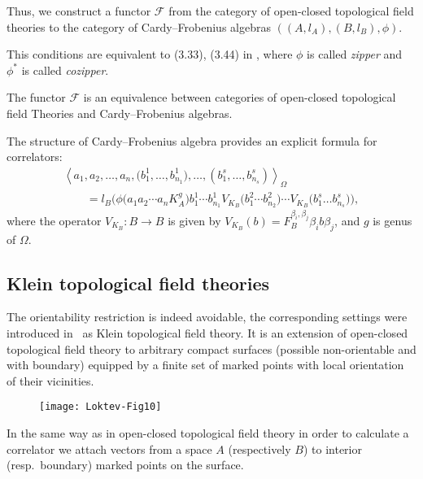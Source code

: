 \documentclass[pdftex]{sigma}
\def \lc {\left<}
\def \rc {\right>}
\begin{document}
Thus, we construct a functor $\mathcal{F}$ from the category of
open-closed  topological f\/ield theories to the category of
Cardy--Frobenius algebras $((A,l_A),(B,l_B),\phi)$.

\begin{note}
This conditions are equivalent to  (3.33), (3.44) in \cite{LP}, where $\phi$ is called {\em zipper} and $\phi^*$  is
called {\em cozipper}.
\end{note}


\begin{theorem}  The functor $\mathcal{F}$
is an equivalence between categories of open-closed topological field
Theories and Cardy--Frobenius algebras.
\end{theorem}

The structure of Cardy--Frobenius algebra provides an explicit formula for correlators:
\begin{gather*}
\lc a_1,a_2,\dots,a_n,\big(b^1_1,\dots,b^1_{n_1}\big),\dots,
(b^s_1,\dots,b^s_{n_s})\rc_{\Omega}\\
\qquad{}= l_B\big( \phi\big(a_1 a_2 \cdots a_n K_A^g\big)  b^1_1 \cdots b^1_{n_1}   V_{K_B}\big(b^2_1 \cdots b^2_{n_2}\big)\cdots
V_{K_B}\big(b^s_1 \dots b^s_{n_s}\big)\big),
\end{gather*}
where the operator
$V_{K_B}:B\rightarrow B$ is given by
$V_{K_B}(b)=F_B^{\beta_i,\beta_j}\beta_i b \beta_j$, and $g$ is genus
of $\Omega$.


\subsection{Klein topological f\/ield theories}

The orientability restriction is indeed avoidable,
the corresponding settings were introduced in~\cite{AN} as Klein topological f\/ield
theory.
It is an extension of open-closed topological f\/ield theory
to arbitrary compact surfaces (possible non-orientable and with
boundary) equipped by a f\/inite set of marked points with local
orientation of their vicinities.


\begin{figure}[tbph]
\centering
\texttt{[image: Loktev-Fig10]}
\caption{}\label{f10}
\end{figure}


In the same way as in open-closed topological f\/ield theory in order to
calculate a correlator we
attach vectors from a space $A$ (respectively $B$)  to interior (resp.\ boundary) marked points
on the surface.
\end{document}

